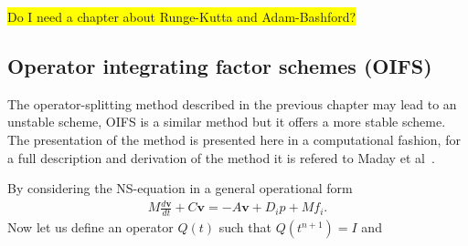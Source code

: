\colorbox{yellow}{Do I need a chapter about Runge-Kutta and Adam-Bashford?}



\subsection{Operator integrating factor schemes (OIFS)}
The operator-splitting method described in the previous chapter may lead to an unstable scheme,
OIFS is a similar method but it offers a more stable scheme. The presentation of the method 
is presented here in a computational fashion, for a full description and derivation of the method 
it is refered to Maday et al~\cite{raey}.

By considering the NS-equation in a general operational form 
\begin{align}
    M\frac{d \mathbf{v}}{dt} + C\mathbf{v} = -A\mathbf{v} +D_i p +Mf_i.
    \label{eq:NSoperator}
\end{align}
Now let us define an operator $Q(t)$ such that $Q(t^{n+1}) = I$ and 

